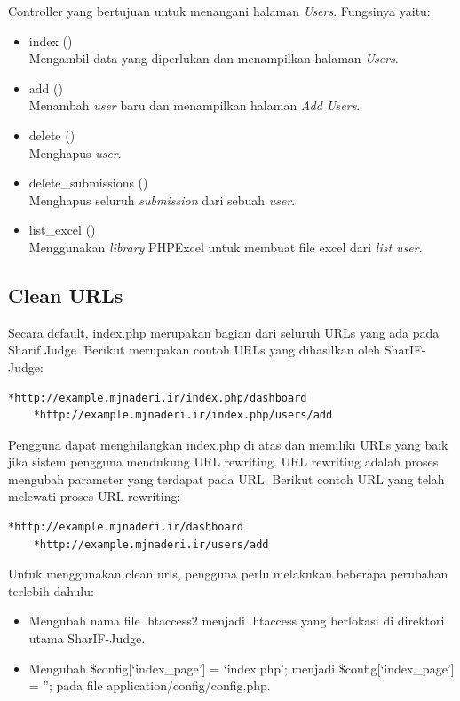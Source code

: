 \begin{itemize}
 Controller yang bertujuan untuk menangani halaman \textit{Users}. Fungsinya yaitu:
        \begin{itemize}
            \item index () \\
 Mengambil data yang diperlukan dan menampilkan halaman \textit{Users}.
            \item add () \\
 Menambah \textit{user} baru dan menampilkan halaman \textit{Add Users}.
            \item delete ()\\
 Menghapus \textit{user}.
            \item delete\_submissions ()\\
 Menghapus seluruh \textit{submission} dari sebuah \textit{user}.
            \item list\_excel ()\\
 Menggunakan \textit{library} PHPExcel untuk membuat file excel dari \textit{list user}.
        \end{itemize}
\end{itemize}

\subsection{Clean URLs}
\label{sec: Clean URLs}
Secara default, index.php merupakan bagian dari seluruh URLs yang ada pada Sharif Judge. Berikut merupakan contoh URLs yang dihasilkan oleh SharIF-Judge:
 \begin{lstlisting}[basicstyle=\ttfamily, frame=single,
    columns=fullflexible, breaklines=true, numbers=none]
    *http://example.mjnaderi.ir/index.php/dashboard
    *http://example.mjnaderi.ir/index.php/users/add
    \end{lstlisting}
    
Pengguna dapat menghilangkan index.php di atas dan memiliki URLs yang baik jika sistem pengguna mendukung URL rewriting. URL rewriting adalah proses mengubah parameter yang terdapat pada URL. Berikut contoh URL yang telah melewati proses URL rewriting:
 \begin{lstlisting}[basicstyle=\ttfamily, frame=single,
    columns=fullflexible, breaklines=true, numbers=none]
    *http://example.mjnaderi.ir/dashboard
    *http://example.mjnaderi.ir/users/add
    \end{lstlisting}
Untuk menggunakan clean urls, pengguna perlu melakukan beberapa perubahan terlebih dahulu:
\begin{itemize}
    \item Mengubah nama file .htaccess2 menjadi .htaccess yang berlokasi di direktori utama SharIF-Judge.
    \item Mengubah \$config[`index\_page'] = `index.php'; menjadi \$config[`index\_page'] = ”; pada file application/config/config.php.
\end{itemize}

